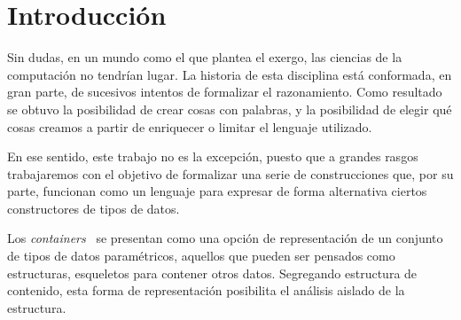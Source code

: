 \chapter*{Introducci\'on}

\begin{epigraphs}
\end{epigraphs} 

Sin dudas, en un mundo como el que plantea el exergo, las ciencias de la computación no tendrían lugar. La historia de esta disciplina está conformada, en gran parte, de sucesivos intentos de formalizar el razonamiento. Como resultado se obtuvo la posibilidad de crear cosas con palabras, y la posibilidad de elegir qué cosas creamos a partir de enriquecer o limitar el lenguaje utilizado.

En ese sentido, este trabajo no es la excepción, puesto que a grandes rasgos trabajaremos con el objetivo de formalizar una serie de construcciones que, por su parte, funcionan como un lenguaje para expresar de forma alternativa ciertos constructores de tipos de datos.

Los {\it containers}~\cite{abbott:thesis,abbott:2003} se presentan como una opción de representación de un conjunto de tipos de datos paramétricos, aquellos que pueden ser pensados como estructuras, esqueletos para contener otros datos. Segregando estructura de contenido, esta forma de representación posibilita el análisis aislado de la estructura.

